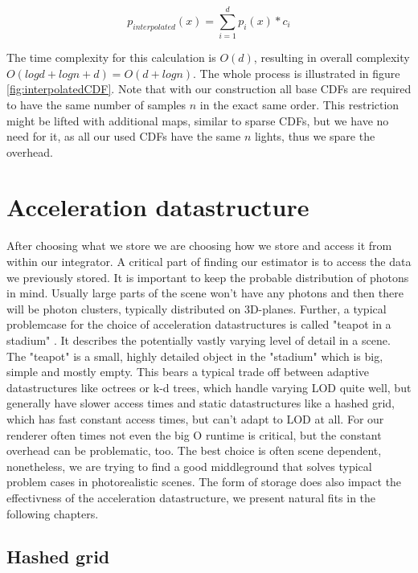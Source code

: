 \begin{equation}\label{eq:pinter}
    p_{interpolated}(x) = \sum_{i=1}^{d}p_{i}(x) * c_i
\end{equation}

The time complexity for this calculation is $O(d)$, resulting in overall complexity $O(logd + logn + d) = O(d + logn)$. The whole process is illustrated in figure \ref{fig:interpolatedCDF}. Note that with our construction all base CDFs are required to have the same number of samples $n$ in the exact same order. This restriction might be lifted with additional maps, similar to sparse CDFs, but we have no need for it, as all our used CDFs have the same $n$ lights, thus we spare the overhead.




\section{Acceleration datastructure}

After choosing what we store we are choosing how we store and access it from within our integrator. A critical part of finding our estimator is to access the data we previously stored. It is important to keep the probable distribution of photons in mind. Usually large parts of the scene won't have any photons and then there will be photon clusters, typically distributed on 3D-planes. Further, a typical problemcase for the choice of acceleration datastructures is called "teapot in a stadium" . It describes the potentially vastly varying level of detail in a scene. The "teapot" is a small, highly detailed object in the "stadium" which is big, simple and mostly empty. This bears a typical trade off between adaptive datastructures like octrees or k-d trees, which handle varying LOD quite well, but generally have slower access times and static datastructures like a hashed grid, which has fast constant access times, but can't adapt to LOD at all. For our renderer often times not even the big O runtime is critical, but the constant overhead can be problematic, too. The best choice is often scene dependent, nonetheless, we are trying to find a good middleground that solves typical problem cases in photorealistic scenes. The form of storage does also impact the effectivness of the acceleration datastructure, we present natural fits in the following chapters.

\subsection{Hashed grid}

